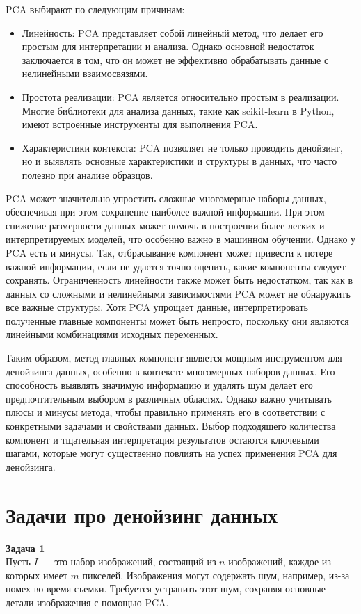 PCA выбирают по следующим причинам:
\begin{itemize}
\item Линейность: PCA представляет собой линейный метод, что делает его простым для интерпретации и анализа. Однако основной недостаток заключается в том, что он может не эффективно обрабатывать данные с нелинейными взаимосвязями.

\item Простота реализации: PCA является относительно простым в реализации. Многие библиотеки для анализа данных, такие как scikit-learn в Python, имеют встроенные инструменты для выполнения PCA.

\item Характеристики контекста: PCA позволяет не только проводить денойзинг, но и выявлять основные характеристики и структуры в данных, что часто полезно при анализе образцов.
\end{itemize}

PCA может значительно упростить сложные многомерные наборы данных, обеспечивая при этом сохранение наиболее важной информации. При этом снижение размерности данных может помочь в построении более легких и интерпретируемых моделей, что особенно важно в машинном обучении.
Однако у PCA есть и минусы. Так, отбрасывание компонент может привести к потере важной информации, если не удается точно оценить, какие компоненты следует сохранять. Ограниченность линейности также может быть недостатком, так как в данных со сложными и нелинейными зависимостями PCA может не обнаружить все важные структуры. Хотя PCA упрощает данные, интерпретировать полученные главные компоненты может быть непросто, поскольку они являются линейными комбинациями исходных переменных.

Таким образом, метод главных компонент является мощным инструментом для денойзинга данных, особенно в контексте многомерных наборов данных. Его способность выявлять значимую информацию и удалять шум делает его предпочтительным выбором в различных областях. Однако важно учитывать плюсы и минусы метода, чтобы правильно применять его в соответствии с конкретными задачами и свойствами данных. Выбор подходящего количества компонент и тщательная интерпретация результатов остаются ключевыми шагами, которые могут существенно повлиять на успех применения PCA для денойзинга.

\section{Задачи про денойзинг данных}
\textbf{Задача 1}\\
Пусть \( I \) — это набор изображений, состоящий из \( n \) изображений, каждое из которых имеет \( m \) пикселей. Изображения могут содержать шум, например, из-за помех во время съемки. Требуется устранить этот шум, сохраняя основные детали изображения с помощью PCA.

